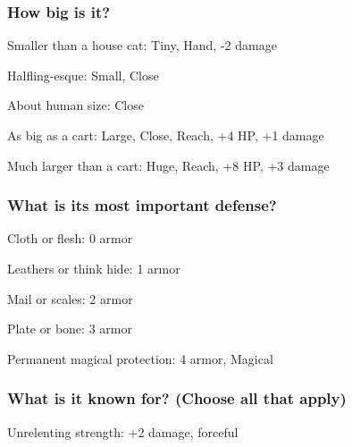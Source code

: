 \stopitemize
 
\subsubsection{How big is it?}   
 
\startitemize[1,packed]

\item Smaller than a house cat: Tiny, Hand, -2 damage

 
\item Halfling-esque: Small, Close

 
\item About human size: Close

 
\item As big as a cart: Large, Close, Reach, +4 HP, +1 damage

 
\item Much larger than a cart: Huge, Reach, +8 HP, +3 damage


\stopitemize
 
\subsubsection{What is its most important defense?}    
 
\startitemize[1,packed]

\item Cloth or flesh: 0 armor

 
\item Leathers or think hide: 1 armor

 
\item Mail or scales: 2 armor

 
\item Plate or bone: 3 armor

 
\item Permanent magical protection: 4 armor, Magical


\stopitemize
 
\subsubsection{What is it known for? (Choose all that apply)}    
 
\startitemize[1,packed]

\item Unrelenting strength: +2 damage, forceful

